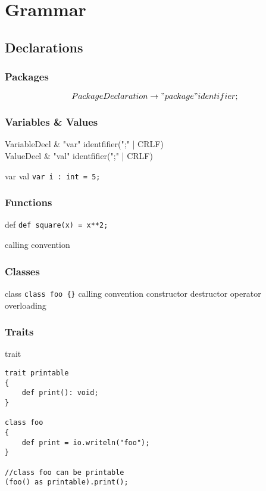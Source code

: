 \documentclass[a4paper]{article}
\begin{document}
\section{Grammar}

\subsection{Declarations}

\subsubsection*{Packages}
\[PackageDeclaration \rightarrow "package" identifier;\]

\subsubsection*{Variables \& Values}
\begin{ebnf}
	VariableDecl & \rightarrow "var"\; identfifier\; [":" identifier] ["=" Literal] (";" | CRLF) \\
	ValueDecl & \rightarrow "val"\; identfifier\; [":" identifier] ["=" Literal] (";" | CRLF)
\end{ebnf}



var val
\lstinline!var i : int = 5;!

\subsubsection*{Functions}
def
\lstinline!def square(x) = x**2;!

calling convention

\subsubsection*{Classes}
class
\lstinline!class foo {}!
calling convention
constructor
destructor
operator overloading

\subsubsection*{Traits}
trait
\begin{lstlisting}
trait printable
{
	def print(): void;
}

class foo
{
	def print = io.writeln("foo");
}

//class foo can be printable
(foo() as printable).print();
\end{lstlisting}
\end{document}
